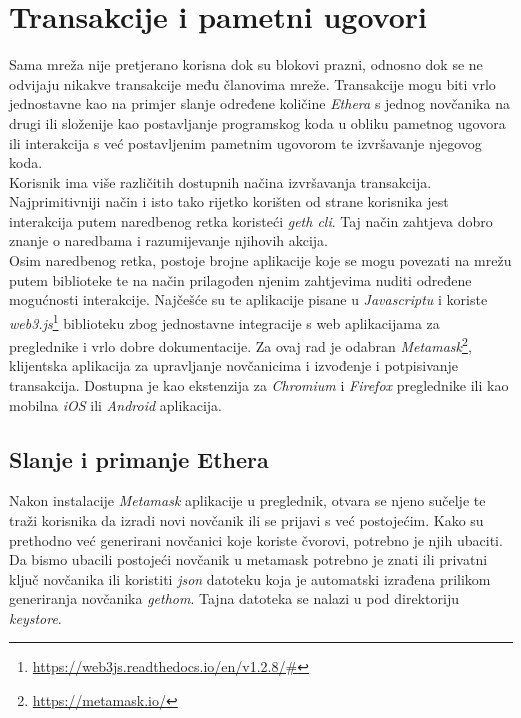 \documentclass[times, utf8, zavrsni, numeric]{fer}
\begin{document}
\section{Transakcije i pametni ugovori}
Sama mreža nije pretjerano korisna dok su blokovi prazni, odnosno dok se ne odvijaju nikakve transakcije među članovima mreže. Transakcije mogu biti vrlo jednostavne
kao na primjer slanje određene količine \emph{Ethera} s jednog novčanika na drugi ili složenije kao postavljanje programskog koda u obliku pametnog ugovora ili interakcija
s već postavljenim pametnim ugovorom te izvršavanje njegovog koda. \\
Korisnik ima više različitih dostupnih načina izvršavanja transakcija. Najprimitivniji način i isto tako rijetko korišten od strane korisnika jest interakcija putem
naredbenog retka koristeći \emph{geth cli}. Taj način zahtjeva dobro znanje o naredbama i razumijevanje njihovih akcija. \\
Osim naredbenog retka, postoje brojne aplikacije koje se mogu povezati na mrežu putem biblioteke te na način prilagođen njenim zahtjevima nuditi određene mogućnosti
interakcije. Najčešće su te aplikacije pisane u \emph{Javascriptu} i koriste \emph{web3.js}\footnote{\url{https://web3js.readthedocs.io/en/v1.2.8/#}} biblioteku zbog
jednostavne integracije s web aplikacijama za preglednike i vrlo dobre dokumentacije.
Za ovaj rad je odabran \emph{Metamask}\footnote{\url{https://metamask.io/}}, klijentska aplikacija za upravljanje novčanicima i izvođenje i potpisivanje transakcija. 
Dostupna je kao ekstenzija za \emph{Chromium} i \emph{Firefox} preglednike ili kao mobilna \emph{iOS} ili \emph{Android} aplikacija. 
\subsection{Slanje i primanje Ethera}
Nakon instalacije \emph{Metamask} aplikacije u preglednik, otvara se njeno sučelje te traži korisnika da izradi novi novčanik ili se prijavi s već postojećim.
Kako su prethodno već generirani novčanici koje koriste čvorovi, potrebno je njih ubaciti. Da bismo ubacili postojeći novčanik u metamask potrebno je znati ili
privatni ključ novčanika ili koristiti \emph{json} datoteku koja je automatski izrađena prilikom generiranja novčanika \emph{gethom}. Tajna datoteka se nalazi
u pod direktoriju \emph{keystore}.
\end{document}
